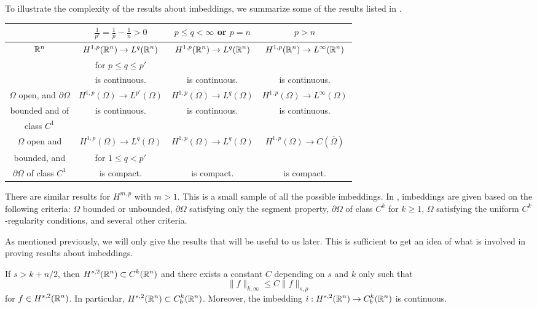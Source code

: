 To illustrate the complexity of the results about imbeddings, we
summarize some of the results listed in \cite{Br}.
\begin{center}
\begin{tabular}{c|c|c|c}
& $\displaystyle \frac{1}{p'} = \frac{1}{p} - \frac{1}{n} > 0$
& $p\leq q < \infty$ or $p = n$ & $ p > n$ \\
\hline  
\rule{0pt}{1.2em} $\mathbb{R}^n$ & $\displaystyle H^{1,p}(\mathbb{R}^n)
 \rightarrow L^{q}(\mathbb{R}^n)$
& $\displaystyle H^{1,p}(\mathbb{R}^n) \rightarrow L^{q}(\mathbb{R}^n)$
& $\displaystyle H^{1,p}(\mathbb{R}^n) \rightarrow L^{\infty}(\mathbb{R}^n)$ \\
& for $p \leq q \leq p'$ & & \\
& is continuous. & is continuous. & is continuous. \\
\hline
\rule{0pt}{1.2em} $\Omega$ open, and $\partial \Omega$
& $\displaystyle H^{1,p}(\Omega) \rightarrow L^{p'}(\Omega)$
& $\displaystyle H^{1,p}(\Omega) \rightarrow L^{q}(\Omega)$
& $\displaystyle H^{1,p}(\Omega) \rightarrow L^{\infty}(\Omega)$ \\
bounded and of & is continuous. & is continuous. & is continuous. \\
class $C^1$ & & & \\
\hline
\rule{0pt}{1.2em} $\Omega$ open and
& $\displaystyle H^{1,p}(\Omega) \rightarrow L^{q}(\Omega)$
& $\displaystyle H^{1,p}(\Omega) \rightarrow L^{q}(\Omega)$
& $\displaystyle H^{1,p}(\Omega) \rightarrow C(\overline{\Omega})$ \\
bounded, and & for $1 \leq q < p'$ & & \\
$\partial \Omega$ of class $\displaystyle C^1$ & is compact. & is compact.
& is compact. \\
\hline
\end{tabular}
\end{center}
There are similar results for $\displaystyle H^{m,p}$ with $m>1$.
This is a small sample of all the possible imbeddings.  In \cite{Ad},
imbeddings are given based on the following criteria: $\Omega$ bounded or
unbounded, $\partial \Omega$ satisfying only the segment property,
$\partial \Omega$ of class $\displaystyle C^k$ for $k\geq 1$, $\Omega$
satisfying the uniform $\displaystyle C^k$-regularity conditions, and
several other criteria.

As mentioned previously, we will only give the results that will be
useful to us later.  This is sufficient to get an idea of what is
involved in proving results about imbeddings.

\begin{theorem} \label{sob_TheSobLemma}
If $s >k +n/2$, then $\displaystyle H^{s,2}(\mathbb{R}^n) \subset C^k(\mathbb{R}^n)$ and there
exists a constant $C$ depending on $s$ and $k$ only such that
\begin{equation} \label{sob_sob_lemma_max}
\|f\|_{k,\infty} \leq C \|f\|_{s,\rho}
\end{equation}
for $\displaystyle f \in H^{s,2}(\mathbb{R}^n)$.
In particular, $\displaystyle H^{s,2}(\mathbb{R}^n) \subset C_b^k(\mathbb{R}^n)$.
Moreover, the imbedding $\displaystyle i:H^{s,2}(\mathbb{R}^n) \to C_b^k(\mathbb{R}^n)$
is continuous.  
\end{theorem}

